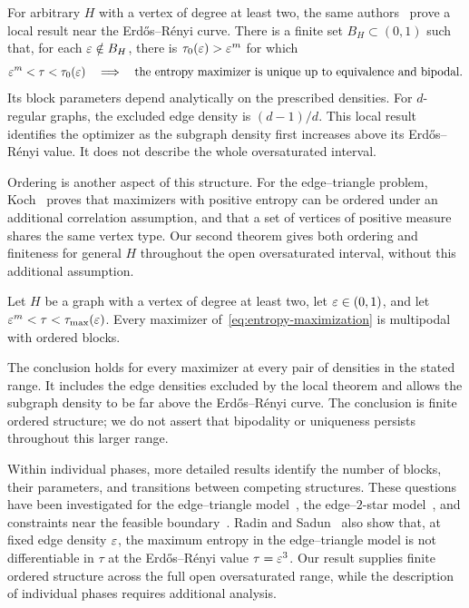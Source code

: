 For arbitrary $H$ with a vertex of degree at least two, the same
authors~\cite[Theorem~1.2]{kenyon2014entropy} prove a local result near
the Erd\H{o}s--R\'enyi curve. There is a finite set $B_H\subset(0,1)$ such
that, for each $\varepsilon\notin B_H$, there is $\tau_0(\varepsilon)>\varepsilon^m$ for which
\[
  \varepsilon^m<\tau<\tau_0(\varepsilon)
  \quad\Longrightarrow\quad
  \text{the entropy maximizer is unique up to equivalence and bipodal}.
\]
Its block parameters depend analytically on the prescribed densities.
For $d$-regular graphs, the excluded edge density is $(d-1)/d$.
This local result identifies the optimizer as the subgraph density first
increases above its Erd\H{o}s--R\'enyi value. It does not describe the
whole oversaturated interval.

Ordering is another aspect of this structure. For the edge--triangle
problem, Koch~\cite{Koch2016} proves that maximizers with positive entropy
can be ordered under an additional correlation assumption, and that a
set of vertices of positive measure shares the same vertex type. Our
second theorem gives both ordering and finiteness for general $H$
throughout the open oversaturated interval, without this additional
assumption.

\begin{theorem}\label{thm:fixed-densities}
Let $H$ be a graph with a vertex of degree at least two, let $\varepsilon\in(0,1)$, and
let $\varepsilon^m<\tau<\tau_{\max}(\varepsilon)$. Every maximizer
of~\eqref{eq:entropy-maximization} is multipodal with ordered blocks.
\end{theorem}

The conclusion holds for every maximizer at every pair of densities in
the stated range. It includes the edge densities excluded by the local
theorem and allows the subgraph density to be far above the
Erd\H{o}s--R\'enyi curve. The conclusion is finite ordered structure;
we do not assert that bipodality or uniqueness persists throughout this
larger range.

Within individual phases, more detailed results identify the number of
blocks, their parameters, and transitions between competing structures.
These questions have been investigated for the edge--triangle
model~\cite{RadinRenSadun2014,KenyonRadinRenSadun2017b,NeemanRadinSadun2023,NeemanRadinSadun2024},
the edge--$2$-star model~\cite{RadinSadunEdge2Star}, and constraints near
the feasible boundary~\cite{RadinSadunNearExtreme}.
Radin and Sadun~\cite{RadinSadun2015} also show that, at fixed edge density
$\varepsilon$, the maximum entropy in the edge--triangle model is not
differentiable in $\tau$ at the Erd\H{o}s--R\'enyi value $\tau=\varepsilon^3$.
Our result supplies
finite ordered structure across the full open oversaturated range,
while the description of individual phases requires additional analysis.

